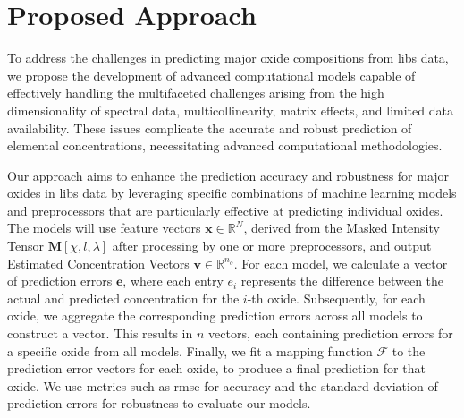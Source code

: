 \section{Proposed Approach}
To address the challenges in predicting major oxide compositions from \gls{libs} data, we propose the development of advanced computational models capable of effectively handling the multifaceted challenges arising from the high dimensionality of spectral data, multicollinearity, matrix effects, and limited data availability.
These issues complicate the accurate and robust prediction of elemental concentrations, necessitating advanced computational methodologies. 

Our approach aims to enhance the prediction accuracy and robustness for major oxides in \gls{libs} data by leveraging specific combinations of machine learning models and preprocessors that are particularly effective at predicting individual oxides.
The models will use feature vectors $\mathbf{x} \in \mathbb{R}^N$, derived from the Masked Intensity Tensor $\mathbf{M}[\chi, l, \lambda]$ after processing by one or more preprocessors, and output Estimated Concentration Vectors $\mathbf{v} \in \mathbb{R}^{n_o}$. 
For each model, we calculate a vector of prediction errors $\mathbf{e}$, where each entry $e_i$ represents the difference between the actual and predicted concentration for the $i$-th oxide. Subsequently, for each oxide, we aggregate the corresponding prediction errors across all models to construct a vector. 
This results in $n$ vectors, each containing prediction errors for a specific oxide from all models.
Finally, we fit a mapping function $\mathcal{F}$ to the prediction error vectors for each oxide, to produce a final prediction for that oxide.
We use metrics such as \gls{rmse} for accuracy and the standard deviation of prediction errors for robustness to evaluate our models.


